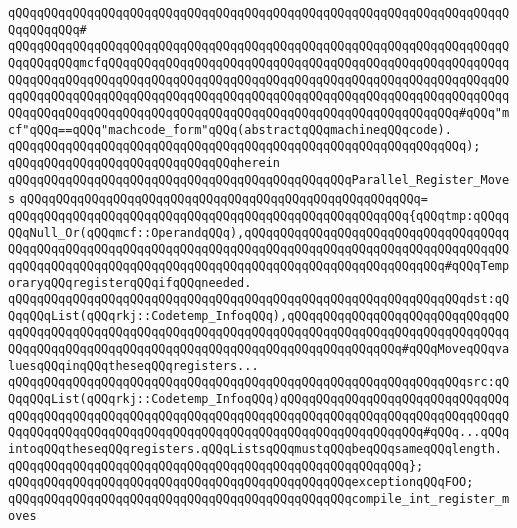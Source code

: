 \verb|qQQqqQQqqQQqqQQqqQQqqQQqqQQqqQQqqQQqqQQqqQQqqQQqqQQqqQQqqQQqqQQqqQQqqQQqqQQqqQQq#|\newline
\verb|qQQqqQQqqQQqqQQqqQQqqQQqqQQqqQQqqQQqqQQqqQQqqQQqqQQqqQQqqQQqqQQqqQQqqQQqqQQqqQQqmcfqQQqqQQqqQQqqQQqqQQqqQQqqQQqqQQqqQQqqQQqqQQqqQQqqQQqqQQqqQQqqQQqqQQqqQQqqQQqqQQqqQQqqQQqqQQqqQQqqQQqqQQqqQQqqQQqqQQqqQQqqQQqqQQqqQQqqQQqqQQqqQQqqQQqqQQqqQQqqQQqqQQqqQQqqQQqqQQqqQQqqQQqqQQqqQQqqQQqqQQqqQQqqQQqqQQqqQQqqQQqqQQqqQQqqQQqqQQqqQQqqQQqqQQqqQQqqQQqqQQq#qQQq"mcf"qQQq==qQQq"machcode_form"qQQq(abstractqQQqmachineqQQqcode).|\newline
\verb|qQQqqQQqqQQqqQQqqQQqqQQqqQQqqQQqqQQqqQQqqQQqqQQqqQQqqQQqqQQqqQQq);|\newline
\verb|qQQqqQQqqQQqqQQqqQQqqQQqqQQqqQQqherein|\newline
\newline
\verb|qQQqqQQqqQQqqQQqqQQqqQQqqQQqqQQqqQQqqQQqqQQqqQQqParallel_Register_Moves|\newline
\verb|qQQqqQQqqQQqqQQqqQQqqQQqqQQqqQQqqQQqqQQqqQQqqQQqqQQqqQQq=|\newline
\verb|qQQqqQQqqQQqqQQqqQQqqQQqqQQqqQQqqQQqqQQqqQQqqQQqqQQqqQQq{qQQqtmp:qQQqqQQqNull_Or(qQQqmcf::OperandqQQq),qQQqqQQqqQQqqQQqqQQqqQQqqQQqqQQqqQQqqQQqqQQqqQQqqQQqqQQqqQQqqQQqqQQqqQQqqQQqqQQqqQQqqQQqqQQqqQQqqQQqqQQqqQQqqQQqqQQqqQQqqQQqqQQqqQQqqQQqqQQqqQQqqQQqqQQqqQQqqQQqqQQqqQQq#qQQqTemporaryqQQqregisterqQQqifqQQqneeded.|\newline
\verb|qQQqqQQqqQQqqQQqqQQqqQQqqQQqqQQqqQQqqQQqqQQqqQQqqQQqqQQqqQQqqQQqdst:qQQqqQQqList(qQQqrkj::Codetemp_InfoqQQq),qQQqqQQqqQQqqQQqqQQqqQQqqQQqqQQqqQQqqQQqqQQqqQQqqQQqqQQqqQQqqQQqqQQqqQQqqQQqqQQqqQQqqQQqqQQqqQQqqQQqqQQqqQQqqQQqqQQqqQQqqQQqqQQqqQQqqQQqqQQqqQQqqQQqqQQqqQQq#qQQqMoveqQQqvaluesqQQqinqQQqtheseqQQqregisters...|\newline
\verb|qQQqqQQqqQQqqQQqqQQqqQQqqQQqqQQqqQQqqQQqqQQqqQQqqQQqqQQqqQQqqQQqsrc:qQQqqQQqList(qQQqrkj::Codetemp_InfoqQQq)qQQqqQQqqQQqqQQqqQQqqQQqqQQqqQQqqQQqqQQqqQQqqQQqqQQqqQQqqQQqqQQqqQQqqQQqqQQqqQQqqQQqqQQqqQQqqQQqqQQqqQQqqQQqqQQqqQQqqQQqqQQqqQQqqQQqqQQqqQQqqQQqqQQqqQQqqQQqqQQq#qQQq...qQQqintoqQQqtheseqQQqregisters.qQQqListsqQQqmustqQQqbeqQQqsameqQQqlength.|\newline
\verb|qQQqqQQqqQQqqQQqqQQqqQQqqQQqqQQqqQQqqQQqqQQqqQQqqQQqqQQq};|\newline
\newline
\verb|qQQqqQQqqQQqqQQqqQQqqQQqqQQqqQQqqQQqqQQqqQQqqQQqexceptionqQQqFOO;|\newline
\newline
\verb|qQQqqQQqqQQqqQQqqQQqqQQqqQQqqQQqqQQqqQQqqQQqqQQqcompile_int_register_moves|\newline
